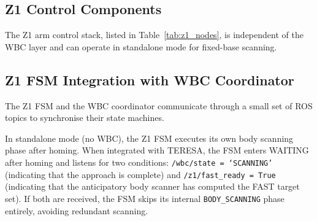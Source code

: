 \subsection{Z1 Control Components}

The Z1 arm control stack, listed in Table~\ref{tab:z1_nodes}, is
independent of the \ac{WBC} layer and can operate in standalone mode
for fixed-base scanning.

\begin{table}[t]
  \centering
  \caption{Z1 arm control and scanning nodes.}
  \label{tab:z1_nodes}
\end{table}

\subsection{Z1 FSM Integration with WBC Coordinator}

The Z1 \ac{FSM} and the WBC coordinator communicate through a small set
of \ac{ROS} topics to synchronise their state machines.

In standalone mode (no WBC), the Z1 \ac{FSM} executes its own body
scanning phase after homing. When integrated with \ac{TERESA}, the
\ac{FSM} enters WAITING after homing and listens for two conditions:
\texttt{/wbc/state = `SCANNING'} (indicating that the approach is
complete) and \texttt{/z1/fast\_ready = True} (indicating that the
anticipatory body scanner has computed the FAST target set). If both are
received, the \ac{FSM} skips its internal \texttt{BODY\_SCANNING} phase
entirely, avoiding redundant scanning.

